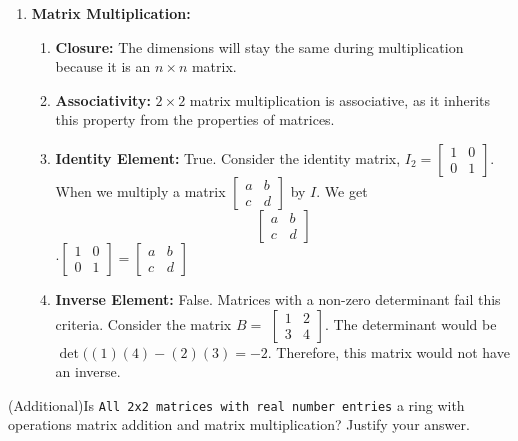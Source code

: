 {\begin{enumerate}
\begin{enumerate}[label=(\arabic*)]
            
        \end{enumerate}
        \item \textbf{Matrix Multiplication:} \xmark
        \begin{enumerate}[label=(\arabic*)]
            \item \textbf{Closure:} The dimensions will stay the same during multiplication because it is an \(n \times n\) matrix. 
            \item \textbf{Associativity:} \(2 \times 2\) matrix multiplication is associative, as it inherits this property from the properties of matrices.
            \item \textbf{Identity Element:} True. Consider the identity matrix, \(I_2 =
            \begin{bmatrix}
                1 & 0 \\
                0 & 1
            \end{bmatrix}\). When we multiply a matrix \(\begin{bmatrix}
                a & b \\
                c & d
            \end{bmatrix}\) by \(I\). We get \[\begin{bmatrix}
                a & b \\
                c & d
            \end{bmatrix}\] \(\cdot
            \begin{bmatrix}
                1 & 0 \\
                0 & 1
            \end{bmatrix} = \begin{bmatrix}
                a & b \\
                c & d
            \end{bmatrix}\)
            \item \textbf{Inverse Element:} False. Matrices with a non-zero determinant fail this criteria. Consider the matrix \(B =\)
            \(\begin{bmatrix}
                1 & 2 \\
                3 & 4 
            \end{bmatrix}\). The determinant would be \(\det((1)(4) - (2)(3) = -2\). Therefore, this matrix would not have an inverse. 
        \end{enumerate}
    \end{enumerate}
}

\begin{exercise}
    {(Additional)}Is \texttt{All 2x2 matrices with real number entries} a ring with operations matrix addition and matrix multiplication? Justify your answer.
\end{exercise}

